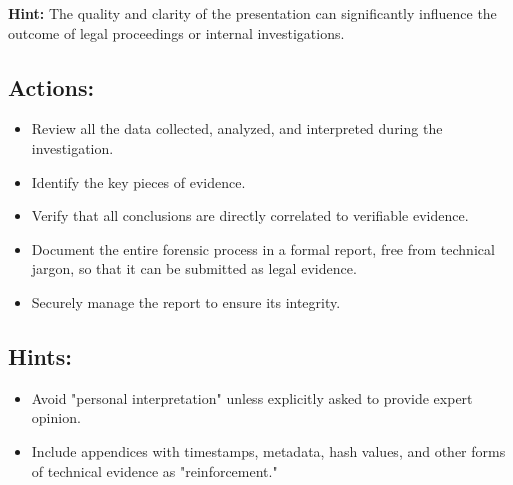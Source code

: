 \textbf{Hint:} The quality and clarity of the presentation can significantly influence the outcome of legal proceedings or internal investigations.

\subsection*{Actions:}
\begin{itemize}[itemsep=0pt]
    \item Review all the data collected, analyzed, and interpreted during the investigation.
    \item Identify the key pieces of evidence.
    \item Verify that all conclusions are directly correlated to verifiable evidence.
    \item Document the entire forensic process in a formal report, free from technical jargon, so that it can be submitted as legal evidence.
    \item Securely manage the report to ensure its integrity.
\end{itemize}

\subsection*{Hints:}
\begin{itemize}[itemsep=0pt]
    \item Avoid "personal interpretation" unless explicitly asked to provide expert opinion.
    \item Include appendices with timestamps, metadata, hash values, and other forms of technical evidence as "reinforcement."
\end{itemize}